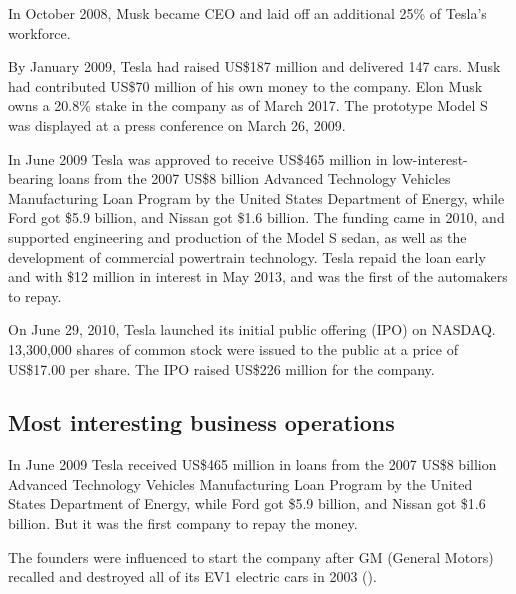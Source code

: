 \documentclass[12pt]{article}
\begin{document}
In October 2008, Musk became CEO and laid off an additional 25\% of Tesla's workforce.

By January 2009, Tesla had raised US\$187 million and delivered 147 cars. Musk had contributed US\$70 million of his own money to the company. Elon Musk owns a 20.8\% stake in the company as of March 2017. The prototype Model S was displayed at a press conference on March 26, 2009. 

In June 2009 Tesla was approved to receive US\$465 million in low-interest-bearing loans from the 2007 US\$8 billion Advanced Technology Vehicles Manufacturing Loan Program by the United States Department of Energy, while Ford got \$5.9 billion, and Nissan got \$1.6 billion. The funding came in 2010, and supported engineering and production of the Model S sedan, as well as the development of commercial powertrain technology. Tesla repaid the loan early and with \$12 million in interest in May 2013, and was the first of the automakers to repay.

On June 29, 2010, Tesla launched its initial public offering (IPO) on NASDAQ. 13,300,000 shares of common stock were issued to the public at a price of US\$17.00 per share. The IPO raised US\$226 million for the company.

\subsection{Most interesting business operations}

In June 2009 Tesla received US\$465 million in loans from the 2007 US\$8 billion Advanced Technology Vehicles Manufacturing Loan Program by the United States Department of Energy, while Ford got \$5.9 billion, and Nissan got \$1.6 billion. But it was the first company to repay the money.

The founders were influenced to start the company after GM (General Motors) recalled and destroyed all of its EV1 electric cars in 2003 (\cite{mu17}).





\newpage
\printbibliography 
\end{document}

